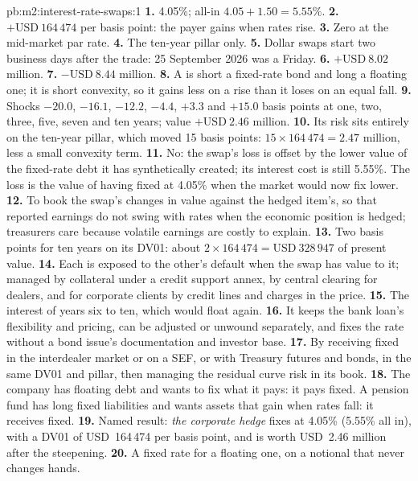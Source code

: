 \begin{solution}{pb:m2:interest-rate-swaps:1}
\textbf{1.} 4.05\%; all-in $4.05 + 1.50 = 5.55\%$.
\textbf{2.} $+\text{USD}~164\,474$ per basis point: the payer gains when rates rise.
\textbf{3.} Zero at the mid-market par rate.
\textbf{4.} The ten-year pillar only.
\textbf{5.} Dollar swaps start two business days after the trade: 25 September
2026 was a Friday.
\textbf{6.} $+\text{USD}~8.02$ million.
\textbf{7.} $-\text{USD}~8.44$ million.
\textbf{8.} A  is short a fixed-rate bond and long a floating one; it
is short convexity, so it gains less on a rise than it loses on an equal fall.
\textbf{9.} Shocks $-20.0$, $-16.1$, $-12.2$, $-4.4$, $+3.3$ and $+15.0$ basis points at
one, two, three, five, seven and ten years; value $+\text{USD}~2.46$ million.
\textbf{10.} Its risk sits entirely on the ten-year pillar, which moved 15 basis
points: $15 \times 164\,474 = 2.47$ million, less a small convexity term.
\textbf{11.} No: the swap's loss is offset by the lower value of the fixed-rate
debt it has synthetically created; its interest cost is still 5.55\%. The loss
is the value of having fixed at 4.05\% when the market would now fix lower.
\textbf{12.} To book the swap's changes in value against the hedged item's, so
that reported earnings do not swing with rates when the economic position is
hedged; treasurers care because volatile earnings are costly to explain.
\textbf{13.} Two basis points for ten years on its DV01: about $2 \times 164\,474 =
\text{USD}~328\,947$ of present value.
\textbf{14.} Each is exposed to the other's default when the swap has value to
it; managed by collateral under a credit support annex, by central clearing
for dealers, and for corporate clients by credit lines and charges in the
price.
\textbf{15.} The interest of years six to ten, which would float again.
\textbf{16.} It keeps the bank loan's flexibility and pricing, can be adjusted or
unwound separately, and fixes the rate without a bond issue's documentation
and investor base.
\textbf{17.} By receiving fixed in the interdealer market or on a SEF, or with
Treasury futures and bonds, in the same DV01 and pillar, then managing the
residual curve risk in its book.
\textbf{18.} The company has floating debt and wants to fix what it pays: it pays
fixed. A pension fund has long fixed liabilities and wants assets that gain
when rates fall: it receives fixed.
\textbf{19.} Named result: \emph{the corporate hedge} fixes at 4.05\% (5.55\% all in),
with a DV01 of USD~164\,474 per basis point, and is worth USD~2.46 million after the
steepening.
\textbf{20.} A fixed rate for a floating one, on a notional that never changes
hands.
\end{solution}

